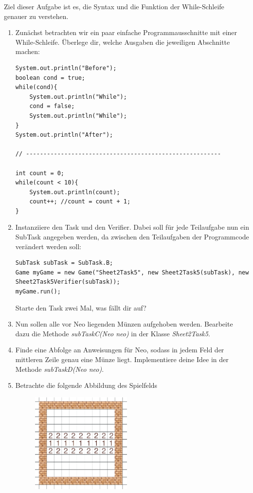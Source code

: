 Ziel dieser Aufgabe ist es, die Syntax und die Funktion der While-Schleife genauer zu verstehen.
\begin{enumerate}[label=\alph*)]
    \item Zunächst betrachten wir ein paar einfache Programmausschnitte mit einer While-Schleife.
    Überlege dir, welche Ausgaben die jeweiligen Abschnitte machen:
    \begin{lstlisting}
System.out.println("Before");
boolean cond = true;
while(cond){
    System.out.println("While");
    cond = false;
    System.out.println("While");
}
System.out.println("After");

// --------------------------------------------------------

int count = 0;
while(count < 10){
    System.out.println(count);
    count++; //count = count + 1;
}
    \end{lstlisting}
    \item Instanziiere den Task und den Verifier. Dabei soll für jede Teilaufgabe nun ein SubTask angegeben werden, da zwischen
    den Teilaufgaben der Programmcode verändert werden soll:
    \begin{lstlisting}[breaklines=true]
SubTask subTask = SubTask.B;
Game myGame = new Game("Sheet2Task5", new Sheet2Task5(subTask), new Sheet2Task5Verifier(subTask));
myGame.run();
    \end{lstlisting}
    Starte den Task zwei Mal, was fällt dir auf?
    \item Nun sollen alle vor Neo liegenden Münzen aufgehoben werden. Bearbeite dazu die Methode \textit{subTaskC(Neo neo)} in der Klasse \textit{Sheet2Task5}.
    \item Finde eine Abfolge an Anweisungen für Neo, sodass in jedem Feld der mittleren Zeile genau eine Münze liegt. Implementiere deine Idee in der Methode
    \textit{subTaskD(Neo neo)}.
    \item Betrachte die folgende Abbildung des Spielfelds
    \begin{figure}[h!]
        \centering
        \includegraphics[height=5cm]{figures/ex05e.png}

\end{figure}
\end{enumerate}
